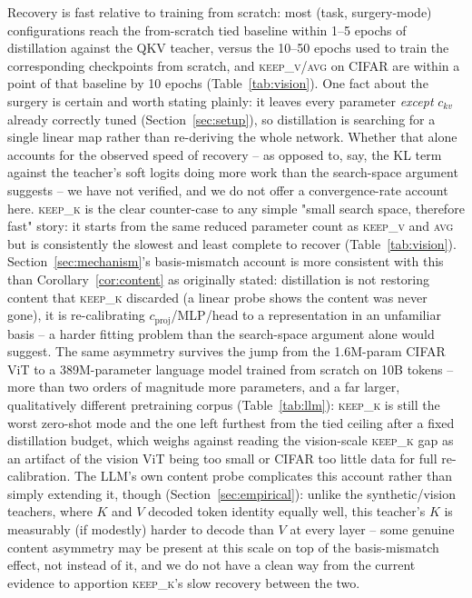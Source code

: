 \documentclass[11pt]{article}
\begin{document}
Recovery is fast relative to training from scratch: most (task, surgery-mode)
configurations reach the from-scratch tied baseline within 1--5 epochs of
distillation against the QKV teacher, versus the 10--50 epochs used to train the
corresponding checkpoints from scratch, and \textsc{keep\_v}/\textsc{avg} on CIFAR are
within a point of that baseline by 10 epochs (Table~\ref{tab:vision}). One fact about
the surgery
is certain and worth stating plainly: it leaves every parameter \emph{except}
$c_{kv}$ already correctly tuned (Section~\ref{sec:setup}), so distillation is
searching for a single linear map rather than re-deriving the whole network. Whether
that alone accounts for the observed speed of recovery -- as opposed to, say, the KL
term against the teacher's soft logits doing more work than the search-space argument
suggests -- we have not verified, and we do not offer a convergence-rate account here.
\textsc{keep\_k} is the clear counter-case to any simple "small search space, therefore
fast" story: it starts from the same reduced parameter count as \textsc{keep\_v} and
\textsc{avg} but is consistently the slowest and least complete to recover
(Table~\ref{tab:vision}). Section~\ref{sec:mechanism}'s basis-mismatch account is more
consistent with this than Corollary~\ref{cor:content} as originally stated: distillation
is not restoring content that \textsc{keep\_k} discarded (a linear probe shows the
content was never gone), it is re-calibrating $c_{\text{proj}}$/MLP/head to a
representation in an unfamiliar basis -- a harder fitting problem than the search-space
argument alone would suggest. The same asymmetry survives the jump from the 1.6M-param
CIFAR ViT to a 389M-parameter language model trained from scratch on 10B tokens --
more than two orders of magnitude more parameters, and a far larger, qualitatively
different pretraining corpus (Table~\ref{tab:llm}): \textsc{keep\_k} is still the
worst zero-shot mode and the one left furthest from the tied ceiling after a fixed
distillation budget, which weighs against reading the vision-scale \textsc{keep\_k}
gap as an artifact of the vision ViT being too small or CIFAR too little data for
full re-calibration. The LLM's own content probe complicates this account rather than
simply extending it, though (Section~\ref{sec:empirical}): unlike the synthetic/vision
teachers, where $K$ and $V$ decoded token identity equally well, this teacher's $K$ is
measurably (if modestly) harder to decode than $V$ at every layer -- some genuine
content asymmetry may be present at this scale on top of the basis-mismatch effect,
not instead of it, and we do not have a clean way from the current evidence to
apportion \textsc{keep\_k}'s slow recovery between the two.
\end{document}
